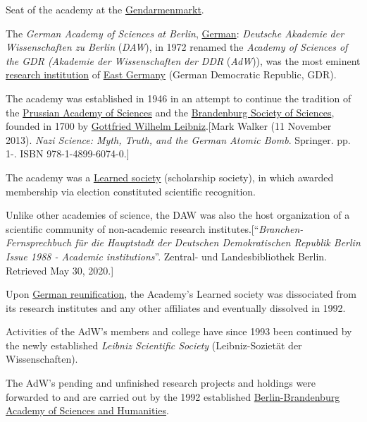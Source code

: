 \documentclass{book}
\numberwithin{equation}{section}
\begin{document}
\textsf{Seat of the academy at the \href{https://en.wikipedia.org/wiki/Gendarmenmarkt}{Gendarmenmarkt}.}

The \textit{German Academy of Sciences at Berlin}, \href{https://en.wikipedia.org/wiki/German_language}{German}: \textit{Deutsche Akademie der Wissenschaften zu Berlin} (\textit{DAW}), in 1972 renamed the \textit{Academy of Sciences of the GDR (Akademie der Wissenschaften der DDR} (\textit{AdW})), was the most eminent \href{https://en.wikipedia.org/wiki/Research_institute}{research institution} of \href{https://en.wikipedia.org/wiki/East_Germany}{East Germany} (German Democratic Republic, GDR).

%
The academy was established in 1946 in an attempt to continue the tradition of the \href{https://en.wikipedia.org/wiki/Prussian_Academy_of_Sciences}{Prussian Academy of Sciences} and the \href{https://en.wikipedia.org/wiki/Brandenburg_Society_of_Sciences}{Brandenburg Society of Sciences}, founded in 1700 by \href{https://en.wikipedia.org/wiki/Gottfried_Wilhelm_Leibniz}{Gottfried Wilhelm Leibniz}.[Mark Walker (11 November 2013). \textit{Nazi Science: Myth, Truth, and the German Atomic Bomb}. Springer. pp. 1-. ISBN 978-1-4899-6074-0.]

The academy was a \href{https://en.wikipedia.org/wiki/Learned_society}{Learned society} (scholarship society), in which awarded membership via election constituted scientific recognition.

Unlike other academies of science, the DAW was also the host organization of a scientific community of non-academic research institutes.[``\textit{Branchen-Fernsprechbuch für die Hauptstadt der Deutschen Demokratischen Republik Berlin Issue 1988 - Academic institutions}''. Zentral- und Landesbibliothek Berlin. Retrieved May 30, 2020.]

%
Upon \href{https://en.wikipedia.org/wiki/German_reunification}{German reunification}, the Academy's Learned society was dissociated from its research institutes and any other affiliates and eventually dissolved in 1992.

Activities of the AdW's members and college have since 1993 been continued by the newly established \textit{Leibniz Scientific Society} (Leibniz-Sozietät der Wissenschaften).

The AdW's pending and unfinished research projects and holdings were forwarded to and are carried out by the 1992 established \href{https://en.wikipedia.org/wiki/Berlin-Brandenburg_Academy_of_Sciences_and_Humanities}{Berlin-Brandenburg Academy of Sciences and Humanities}.
\end{document}
